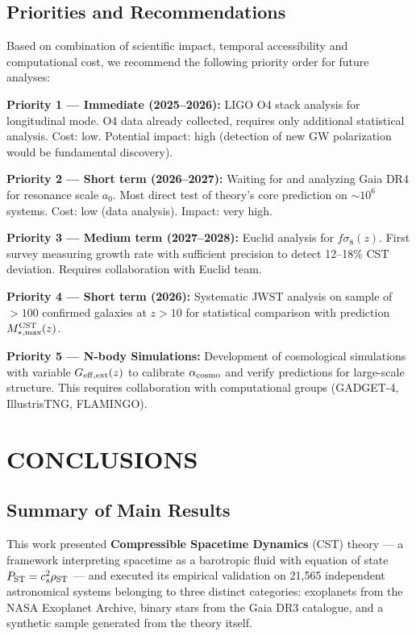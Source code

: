 \documentclass[11pt,a4paper]{article}
\begin{document}
\hypertarget{priorities-and-recommendations}{%
\subsection{Priorities and
Recommendations}\label{priorities-and-recommendations}}

Based on combination of scientific impact, temporal accessibility and
computational cost, we recommend the following priority order for future
analyses:

\textbf{Priority 1 --- Immediate (2025--2026):} LIGO O4 stack analysis
for longitudinal mode. O4 data already collected, requires only
additional statistical analysis. Cost: low. Potential impact: high
(detection of new GW polarization would be fundamental discovery).

\textbf{Priority 2 --- Short term (2026--2027):} Waiting for and
analyzing Gaia DR4 for resonance scale \(a_0\). Most direct test of
theory's core prediction on \(\sim 10^6\) systems. Cost: low (data
analysis). Impact: very high.

\textbf{Priority 3 --- Medium term (2027--2028):} Euclid analysis for
\(f\sigma_8(z)\). First survey measuring growth rate with sufficient
precision to detect 12--18\% CST deviation. Requires collaboration with
Euclid team.

\textbf{Priority 4 --- Short term (2026):} Systematic JWST analysis on
sample of \(> 100\) confirmed galaxies at \(z > 10\) for statistical
comparison with prediction \(M_{*,\rm max}^{\rm CST}(z)\).

\textbf{Priority 5 --- N-body Simulations:} Development of cosmological
simulations with variable \(G_{\rm eff,ext}(z)\) to calibrate
\(\alpha_{\rm cosmo}\) and verify predictions for large-scale structure.
This requires collaboration with computational groups (GADGET-4,
IllustrisTNG, FLAMINGO).

\hypertarget{conclusions}{%
\section{CONCLUSIONS}\label{conclusions}}

\hypertarget{summary-of-main-results}{%
\subsection{Summary of Main
Results}\label{summary-of-main-results}}

This work presented \textbf{Compressible Spacetime Dynamics} (CST)
theory --- a framework interpreting spacetime as a barotropic fluid with
equation of state \(P_{\rm ST} = c_s^2 \rho_{\rm ST}\) --- and executed
its empirical validation on 21,565 independent astronomical systems
belonging to three distinct categories: exoplanets from the NASA
Exoplanet Archive, binary stars from the Gaia DR3 catalogue, and a
synthetic sample generated from the theory itself.
\end{document}
